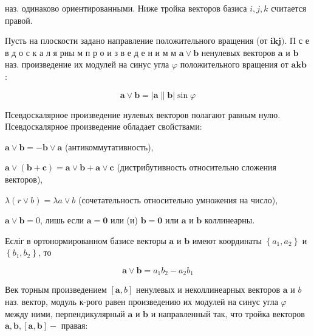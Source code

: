 \documentclass[10pt]{article}
\begin{document}
наз. одинаково ориентированными. Ниже тройка векторов базиса $i, j, k$ считается правой.



Пусть на плоскости задано направление положительного вращения (от $\boldsymbol{i} \boldsymbol{k} \boldsymbol{j})$. П с е в д о с к а л я рны м п р о и з в е д е н и м м $\boldsymbol{a} \vee \boldsymbol{b}$ ненулевых векторов $\boldsymbol{a}$ и $\boldsymbol{b}$ наз. произведение их модулей на синус угла $\varphi$ положительного вращения от $\boldsymbol{a} \boldsymbol{k} \boldsymbol{b}$ :



\[

\boldsymbol{a} \vee \boldsymbol{b}=|\boldsymbol{a} \| \boldsymbol{b}| \sin \varphi

\]



Псевдоскалярное произведение нулевых векторов полагают равным нулю. Псевдоскалярное произведение обладает свойствами:



$\boldsymbol{a} \vee \boldsymbol{b}=-\boldsymbol{b} \vee \boldsymbol{a}$ (антикоммутативность),



$\boldsymbol{a} \vee(\boldsymbol{b}+\boldsymbol{c})=\boldsymbol{a} \vee \boldsymbol{b}+\boldsymbol{a} \vee \boldsymbol{c}$ (дистрибутивность относительно сложения векторов),



$\lambda(r \vee b)=\lambda a \vee b$ (сочетательность относительно умножения на число),



$\boldsymbol{a} \vee \boldsymbol{b}=0$, лишь если $\boldsymbol{a}=\mathbf{0}$ или (и) $\boldsymbol{b}=\mathbf{0}$ или $\boldsymbol{a}$ и $\boldsymbol{b}$ коллинеарны.



Есліг в ортонормированном базисе векторы $\boldsymbol{a}$ и $\boldsymbol{b}$ имеют координаты $\left\{a_{1}, a_{2}\right\}$ и $\left\{b_{1}, b_{2}\right\}$, то



\[

\boldsymbol{a} \vee \boldsymbol{b}=a_{1} b_{2}-a_{2} b_{1}

\]



Век торным произведением $[\boldsymbol{a}, b]$ ненулевых и неколлинеарных векторов $\boldsymbol{a}$ и $b$ наз. вектор, модуль к-рого равен произведению их модулей на синус угла $\varphi$ между ними, перпендикулярный $\boldsymbol{a}$ и $\boldsymbol{b}$ и направленный так, что тройка векторов $\boldsymbol{a}, \boldsymbol{b},[\boldsymbol{a}, \boldsymbol{b}]-$ правая:
\end{document}
